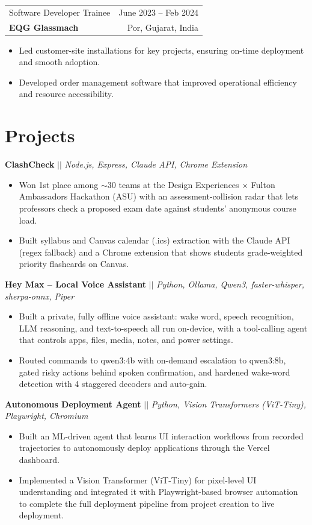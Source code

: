 \documentclass[10pt,letterpaper]{article}
\makeatletter
\newcommand{\entry}[4]{%
  \begin{tabularx}{\textwidth}{@{}X r@{}}
    #1 & #2 \\
    \textbf{#3} & #4 \\
  \end{tabularx}\vspace{-1pt}}
\newcommand{\project}[2]{\textbf{#1} $||$ \textit{#2}\vspace{-1pt}}
\makeatother
\begin{document}
\entry{Software Developer Trainee}{June 2023 -- Feb 2024}{EQG Glassmach}{Por, Gujarat, India}
\begin{itemize}
  \item Led customer-site installations for key projects, ensuring on-time deployment and smooth adoption.
  \item Developed order management software that improved operational efficiency and resource accessibility.
\end{itemize}

\section*{Projects}
\project{ClashCheck}{Node.js, Express, Claude API, Chrome Extension}
\begin{itemize}
  \item Won 1st place among $\sim$30 teams at the Design Experiences $\times$ Fulton Ambassadors Hackathon (ASU) with an
        assessment-collision radar that lets professors check a proposed exam date against students' anonymous course load.
  \item Built syllabus and Canvas calendar (.ics) extraction with the Claude API (regex fallback) and a Chrome extension
        that shows students grade-weighted priority flashcards on Canvas.
\end{itemize}

\project{Hey Max -- Local Voice Assistant}{Python, Ollama, Qwen3, faster-whisper, sherpa-onnx, Piper}
\begin{itemize}
  \item Built a private, fully offline voice assistant: wake word, speech recognition, LLM reasoning, and text-to-speech
        all run on-device, with a tool-calling agent that controls apps, files, media, notes, and power settings.
  \item Routed commands to qwen3:4b with on-demand escalation to qwen3:8b, gated risky actions behind spoken
        confirmation, and hardened wake-word detection with 4 staggered decoders and auto-gain.
\end{itemize}

\project{Autonomous Deployment Agent}{Python, Vision Transformers (ViT-Tiny), Playwright, Chromium}
\begin{itemize}
  \item Built an ML-driven agent that learns UI interaction workflows from recorded trajectories to autonomously deploy
        applications through the Vercel dashboard.
  \item Implemented a Vision Transformer (ViT-Tiny) for pixel-level UI understanding and integrated it with Playwright-based
        browser automation to complete the full deployment pipeline from project creation to live deployment.
\end{itemize}
\end{document}
